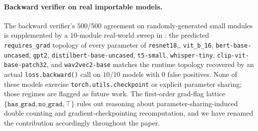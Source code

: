 \paragraph{Backward verifier on real importable models.}
The backward verifier's $500/500$ agreement on randomly-generated
small modules is supplemented by a $10$-module real-world sweep
in : the predicted
\texttt{requires\_grad} topology of every parameter of
\texttt{resnet18},,
\texttt{vit\_b\_16}, \texttt{bert-base-uncased}, \texttt{gpt2},
\texttt{distilbert-base-uncased}, \texttt{t5-small},
\texttt{whisper-tiny}, \texttt{clip-vit-base-patch32}, and
\texttt{wav2vec2-base} matches the runtime topology recovered by
an actual \texttt{loss.backward()} call on $10/10$ models with
$0$ false positives. None of these models exercise
\texttt{torch.utils.checkpoint} or explicit parameter sharing;
those regimes are flagged as future work. The first-order
grad-flag lattice $\{\texttt{has\_grad}, \texttt{no\_grad},
\top\}$ rules out reasoning about parameter-sharing-induced
double counting and gradient-checkpointing recomputation, and
we have renamed the contribution accordingly throughout the
paper.

